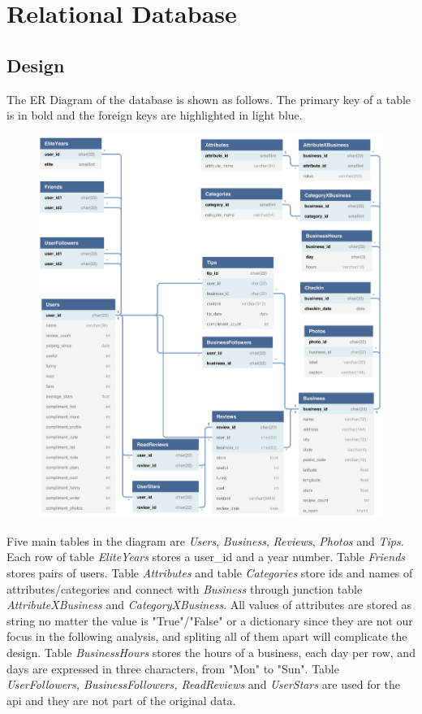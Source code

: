 \documentclass[12pt]{article}
\begin{document}
\section{Relational Database}\label{section-database}
\subsection{Design}
The ER Diagram of the database is shown as follows. The primary key of a table is in bold and the foreign keys are highlighted in light blue.
\begin{figure}[H]
\begin{center}
    \includegraphics[width=1.0\textwidth]{ER_Diagram.png}
\end{center}
\end{figure}
Five main tables in the diagram are {\it Users}, {\it Business}, {\it Reviews}, {\it Photos} and {\it Tips}. Each row of table {\it EliteYears} stores a user\_id and a year number. Table {\it Friends} stores pairs of users. Table {\it Attributes} and table {\it Categories} store ids and names of attributes/categories and connect with {\it Business} through junction table {\it AttributeXBusiness} and {\it CategoryXBusiness}. All values of attributes are stored as string no matter the value is "True"/"False" or a dictionary since they are not our focus in the following analysis, and spliting all of them apart will complicate the design. Table {\it BusinessHours} stores the hours of a business, each day per row, and days are expressed in three characters, from "Mon" to "Sun". Table {\it UserFollowers, BusinessFollowers, ReadReviews} and {\it UserStars} are used for the api and they are not part of the original data.
\end{document}
